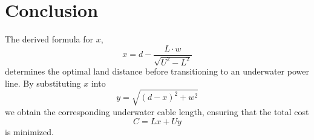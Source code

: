 \documentclass{article}
\begin{document}
\section{Conclusion}
The derived formula for \( x \),
\begin{displaymath}
    x = d - \frac{L \cdot w}{\sqrt{U^2 - L^2}}
\end{displaymath}
determines the optimal land distance before transitioning to an underwater power line. By substituting \( x \) into
\begin{displaymath}
    y = \sqrt{(d - x)^2 + w^2}
\end{displaymath}
we obtain the corresponding underwater cable length, ensuring that the total cost
\begin{displaymath}
    C = Lx + Uy
\end{displaymath}
is minimized.
\end{document}

